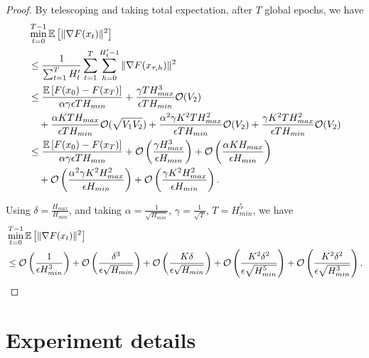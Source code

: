 \documentclass{opt2020} %
\begin{document}
\begin{proof}
By telescoping and taking total expectation, after $T$ global epochs, we have
\begin{align*}
&\min_{t = 0}^{T-1} {\mathbb{E}}\left[ \| \nabla F(x_t) \|^2 \right] \\
&\leq \frac{1}{\sum_{t = 1}^{T} H'_{t}} \sum_{t = 1}^{T} \sum_{h = 0}^{H'_{t}-1} \|\nabla F(x_{\tau, h})\|^2 \\
&\leq \frac{{\mathbb{E}}\left[ F(x_{0}) - F(x_T) \right]}{\alpha \gamma \epsilon T H_{min}}  + \frac{\gamma T H_{max}^3}{\epsilon T H_{min}} {\mathcal O}(V_2) \\
&\quad + \frac{\alpha K T H_{max}}{\epsilon T H_{min}} {\mathcal O}(\sqrt{V_1 V_2})  + \frac{\alpha^2\gamma K^2 T H_{max}^2}{\epsilon T H_{min}} {\mathcal O}(V_2)
 +  \frac{\gamma K^2 T H_{max}^2}{\epsilon T H_{min}} {\mathcal O}(V_2) \\
&\leq \frac{{\mathbb{E}}\left[ F(x_{0}) - F(x_T) \right]}{\alpha \gamma \epsilon T H_{min}}  + {\mathcal O}\left( \frac{\gamma H_{max}^3}{\epsilon H_{min}} \right)
 + {\mathcal O}\left( \frac{\alpha K H_{max}}{\epsilon H_{min}} \right) \\
&\quad + {\mathcal O}\left( \frac{\alpha^2\gamma K^2 H_{max}^2}{\epsilon H_{min}} \right)
 + {\mathcal O}\left( \frac{\gamma K^2 H_{max}^2}{\epsilon H_{min}} \right).
\end{align*}

Using $\delta = \frac{H_{max}}{H_{min}}$, and taking $\alpha = \frac{1}{\sqrt{H_{min}}}$, $\gamma = \frac{1}{\sqrt{T}}$, $T = H_{min}^5$, we have
\begin{align*}
&\min_{t = 0}^{T-1} {\mathbb{E}}\left[ \| \nabla F(x_t) \|^2 \right] \\
&\leq {\mathcal O}\left( \frac{1}{\epsilon H_{min}^3} \right)
 + {\mathcal O}\left( \frac{\delta^3}{\epsilon \sqrt{H_{min}}} \right)
 + {\mathcal O}\left( \frac{K \delta}{\epsilon \sqrt{H_{min}}} \right)
 + {\mathcal O}\left( \frac{K^2 \delta^2}{\epsilon \sqrt{H_{min}^5}} \right)
 + {\mathcal O}\left( \frac{K^2 \delta^2}{\epsilon \sqrt{H_{min}^3}} \right).
\end{align*}

\end{proof}


\section{Experiment details}
\end{document}
